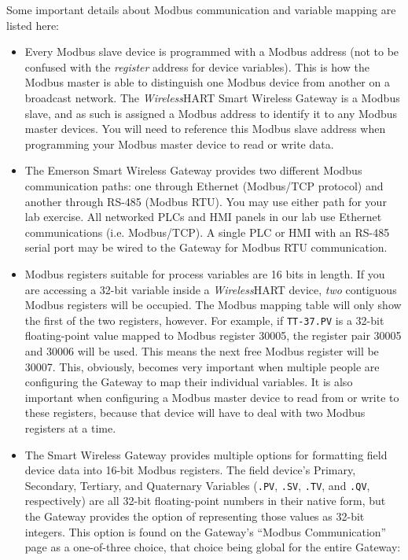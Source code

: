 \vskip 10pt

\filbreak

\noindent
Some important details about Modbus communication and variable mapping are listed here:

\begin{itemize}
\item{} Every Modbus slave device is programmed with a Modbus address (not to be confused with the {\it register} address for device variables).  This is how the Modbus master is able to distinguish one Modbus device from another on a broadcast network.  The {\sl Wireless}HART Smart Wireless Gateway is a Modbus slave, and as such is assigned a Modbus address to identify it to any Modbus master devices.  You will need to reference this Modbus slave address when programming your Modbus master device to read or write data.
\vskip 5pt
\item{} The Emerson Smart Wireless Gateway provides two different Modbus communication paths: one through Ethernet (Modbus/TCP protocol) and another through RS-485 (Modbus RTU).  You may use either path for your lab exercise.  All networked PLCs and HMI panels in our lab use Ethernet communications (i.e. Modbus/TCP).  A single PLC or HMI with an RS-485 serial port may be wired to the Gateway for Modbus RTU communication.
\vskip 5pt
\item{} Modbus registers suitable for process variables are 16 bits in length.  If you are accessing a 32-bit variable inside a {\sl Wireless}HART device, {\it two} contiguous Modbus registers will be occupied.  The Modbus mapping table will only show the first of the two registers, however.  For example, if {\tt TT-37.PV} is a 32-bit floating-point value mapped to Modbus register 30005, the register pair 30005 and 30006 will be used.  This means the next free Modbus register will be 30007.  This, obviously, becomes very important when multiple people are configuring the Gateway to map their individual variables.  It is also important when configuring a Modbus master device to read from or write to these registers, because that device will have to deal with two Modbus registers at a time.
\vskip 5pt
\item{} The Smart Wireless Gateway provides multiple options for formatting field device data into 16-bit Modbus registers.  The field device's Primary, Secondary, Tertiary, and Quaternary Variables ({\tt .PV}, {\tt .SV}, {\tt .TV}, and {\tt .QV}, respectively) are all 32-bit floating-point numbers in their native form, but the Gateway provides the option of representing those values as 32-bit integers.  This option is found on the Gateway's ``Modbus Communication'' page as a one-of-three choice, that choice being global for the entire Gateway:

\end{itemize}
